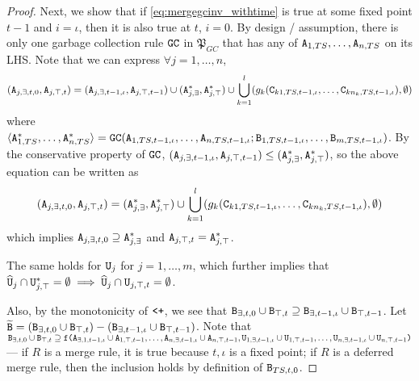 \begin{proof}
Next, we show that if \eqref{eq:mergegcinv_withtime} is true at some fixed point $t-1$ and $i=\iota$, then it is also true at $t$, $i=0$.
By design / assumption, there is only one garbage collection rule $\tt{GC}$ in $\mathfrak{P}_{GC}$ that has any of $\tt{A}_{1,TS},\dots,\tt{A}_{n,TS}$ on its LHS.
Note that we can express $\forall j=1,\dots,n$,
\begin{align*}
(\tt{A}_{j,\exists,t,0}, \tt{A}_{j,\top,t})
= (\tt{A}_{j,\exists,t-1,\iota}, \tt{A}_{j,\top,t-1})
\cup (\tt{A}_{j,\exists}^*, \tt{A}_{j,\top}^*)
\cup \bigcup_{k=1}^l (g_k(\tt{C}_{k1,TS,t-1,\iota}, \dots, \tt{C}_{kn_k,TS,t-1,\iota}), \emptyset)
\end{align*}
where $\langle \tt{A}_{1,TS}^*, \dots, \tt{A}_{n,TS}^*\rangle = \tt{GC}(\tt{A}_{1,TS,t-1,\iota}, \dots, \tt{A}_{n,TS,t-1,\iota}; \tt{B}_{1,TS,t-1,\iota}, \dots, \tt{B}_{m,TS,t-1,\iota})$.
By the conservative property of $\tt{GC}$, $(\tt{A}_{j,\exists,t-1,\iota}, \tt{A}_{j,\top,t-1}) \leq (\tt{A}_{j,\exists}^*, \tt{A}_{j,\top}^*)$, so the above equation can be written as
\begin{align*}
(\tt{A}_{j,\exists,t,0}, \tt{A}_{j,\top,t})
= (\tt{A}_{j,\exists}^*, \tt{A}_{j,\top}^*)
\cup \bigcup_{k=1}^l (g_k(\tt{C}_{k1,TS,t-1,\iota}, \dots, \tt{C}_{kn_k,TS,t-1,\iota}), \emptyset)
\end{align*}
which implies $\tt{A}_{j,\exists,t,0} \supseteq \tt{A}_{j,\exists}^*$ and $\tt{A}_{j,\top,t} = \tt{A}_{j,\top}^*$.

The same holds for $\tt{U}_j$ for $j=1,\dots,m$, which further implies that $\widehat{\tt{U}}_j \cap \tt{U}_{j,\top}^* = \emptyset \implies \widehat{\tt{U}}_j \cap \tt{U}_{j,\top,t} = \emptyset$.

Also, by the monotonicity of $\tt{<+}$, we see that $\tt{B}_{\exists,t,0} \cup \tt{B}_{\top,t} \supseteq \tt{B}_{\exists,t-1,\iota} \cup \tt{B}_{\top,t-1}$.
Let $\widetilde{\tt{B}} = (\tt{B}_{\exists,t,0} \cup \tt{B}_{\top,t}) - (\tt{B}_{\exists,t-1,\iota} \cup \tt{B}_{\top,t-1})$.
Note that
$\tt{B}_{\exists,t,0} \cup \tt{B}_{\top,t} \supseteq \tt{f}\tt{(}\tt{A}_{\exists,1,t-1,\iota} \cup \tt{A}_{1,\top,t-1},\dots,\tt{A}_{n,\exists,t-1,\iota} \cup \tt{A}_{n,\top,t-1}, \tt{U}_{1,\exists,t-1,\iota} \cup \tt{U}_{1,\top,t-1},\dots,\tt{U}_{n,\exists,t-1,\iota} \cup \tt{U}_{n,\top,t-1}\tt{)}$ ---
if $R$ is a merge rule, it is true because $t,\iota$ is a fixed point;
if $R$ is a deferred merge rule, then the inclusion holds by definition of $\tt{B}_{TS,t,0}$.


\end{proof}

